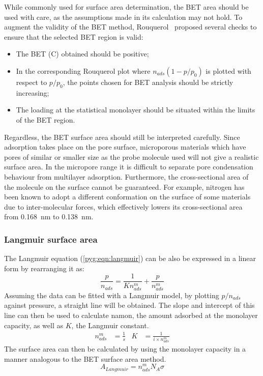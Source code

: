 While commonly used for surface area determination, the \gls{BET} area
should be used with care, as the assumptions made in
its calculation may not hold. To augment the validity of the \gls{BET}
method, Rouquerol~\cite{rouquerolAdsorptionPowdersPorous2013} proposed
several checks to ensure that the selected \gls{BET} region is valid:

\begin{itemize}

	\item The \gls{BET} (\gls{C}) obtained should be positive;
	\item In the corresponding Rouquerol plot where \(n_{ads}(1-p/p_0)\)
	      is plotted with respect to \(p/p_0\), the points chosen for \gls{BET}
	      analysis should be strictly increasing;
	\item The loading at the statistical monolayer should be
	      situated within the limits of the \gls{BET} region.

\end{itemize}

Regardless, the \gls{BET} surface area should still be interpreted carefully.
Since adsorption takes place on the pore surface, microporous materials
which have pores of similar or smaller size as the probe molecule used
will not give a realistic surface area. In the micropore range
it is difficult to separate pore condensation behaviour from
multilayer adsorption. Furthermore, the cross-sectional
area of the molecule on the surface cannot be guaranteed. For example,
nitrogen has been known to adopt a different conformation on the surface
of some materials due to inter-molecular forces, which effectively
lowers its cross-sectional area~\cite{rouquerolAdsorptionPowdersPorous2013}
from \SI{0.168}{\nano\metre} to \SI{0.138}{\nano\metre}.

\subsubsection{Langmuir surface area}\label{pyg:charac:langmuirarea}

The Langmuir equation (\autoref{pyg:eqn:langmuir}) can be also
be expressed in a linear form by rearranging it as:
%
\begin{equation}
	\frac{p}{n_{ads}} = \frac{1}{K n_{ads}^m} + \frac{p}{n_{ads}^m}
\end{equation}
%
Assuming the data can be fitted with a Langmuir model, by plotting
\({p}/{n_{ads}}\) against pressure, a straight line will be obtained.
The slope and intercept of this line can then be used to calculate
\gls{namon}, the amount adsorbed at the monolayer capacity, as well
as \(K\), the Langmuir constant.
%
\begin{align}
	n_{ads}^m & = \frac{1}{s} & K & = \frac{1}{i \times n_{ads}^m}
\end{align}
%
The surface area can then be calculated by using the monolayer
capacity in a manner analogous to the \gls{BET} surface area method.
%
\begin{equation}
	A_{Langmuir} = n_{ads}^m N_A \sigma
\end{equation}

